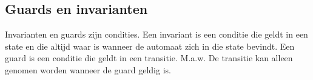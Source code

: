 \documentclass{article}
\begin{document}
	\subsection{Guards en invarianten}
	
	Invarianten en guards zijn condities.
	Een invariant is een conditie die geldt in een state en die altijd
	waar is wanneer de automaat zich in die state bevindt.
	Een guard is een conditie die geldt in een transitie. M.a.w. De
	transitie kan alleen genomen worden wanneer de guard geldig
	is.
	\\
	
	
\end{document}
